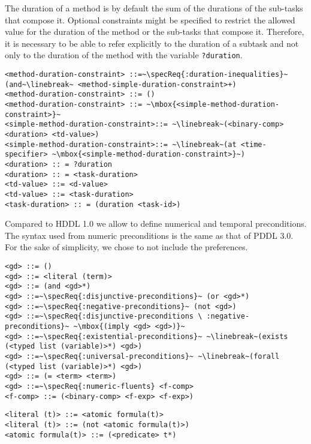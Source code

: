 \documentclass[letterpaper]{article} %
\begin{document}
%
%
The duration of a method is by default the sum of the durations of the sub-tasks that compose it. Optional constraints might be specified to restrict the allowed value for the
duration of the method or the sub-tasks that compose it. Therefore, it is necessary to be able to refer explicitly to the duration of a subtask and not only to the duration of the method with the variable {\tt ?duration}.

\begin{lstlisting}[firstnumber=last, escapechar=~]
<method-duration-constraint> ::=~\specReq{:duration-inequalities}~ (and~\linebreak~ <method-simple-duration-constraint>+)
<method-duration-constraint> ::= ()
<method-duration-constraint> ::= ~\mbox{<simple-method-duration-constraint>}~
<simple-method-duration-constraint>::= ~\linebreak~(<binary-comp> <duration> <td-value>)
<simple-method-duration-constraint>::= ~\linebreak~(at <time-specifier> ~\mbox{<simple-method-duration-constraint>}~)
<duration> :: = ?duration
<duration> :: = <task-duration>
<td-value> ::= <d-value>
<td-value> ::= <task-duration>
<task-duration> :: = (duration <task-id>)
\end{lstlisting}

%
%
\noindent Compared to HDDL 1.0 we allow to define numerical and temporal preconditions. The syntax used from numeric preconditions is the same as that of PDDL 3.0. For the sake of simplicity, we chose to not include the preferences.
\begin{lstlisting}[firstnumber=last, escapechar=~]
<gd> ::= ()
<gd> ::= <literal (term)>
<gd> ::= (and <gd>*)
<gd> ::=~\specReq{:disjunctive-preconditions}~ (or <gd>*)
<gd> ::=~\specReq{:negative-preconditions}~ (not <gd>)
<gd> ::=~\specReq{:disjunctive-preconditions \ :negative-preconditions}~ ~\mbox{(imply <gd> <gd>)}~
<gd> ::=~\specReq{:existential-preconditions}~ ~\linebreak~(exists (<typed list (variable)>*) <gd>)
<gd> ::=~\specReq{:universal-preconditions}~ ~\linebreak~(forall (<typed list (variable)>*) <gd>)
<gd> ::= (= <term> <term>)
<gd> ::=~\specReq{:numeric-fluents} <f-comp>
<f-comp> ::= (<binary-comp> <f-exp> <f-exp>)
\end{lstlisting}

\begin{lstlisting}[firstnumber=last, escapechar=~]
<literal (t)> ::= <atomic formula(t)>
<literal (t)> ::= (not <atomic formula(t)>)
<atomic formula(t)> ::= (<predicate> t*)
\end{lstlisting}
\end{document}
